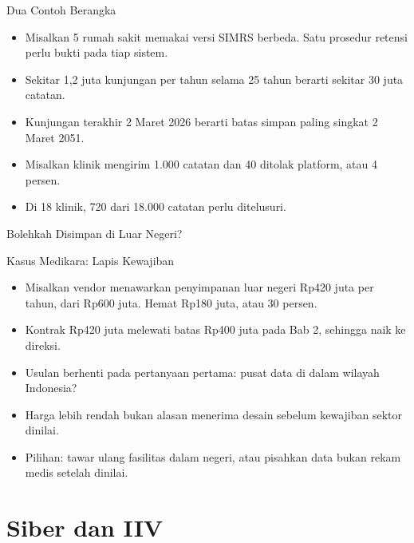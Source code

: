 \documentclass[aspectratio=169, table, 12pt]{beamer}
\begin{document}
\begin{frame}{{\Large Dua Contoh Berangka}}
  \vspace{4pt}
  \small
  \begin{itemize}
    \item Misalkan 5 rumah sakit memakai versi SIMRS berbeda. Satu prosedur retensi perlu bukti pada tiap
          sistem.
    \item Sekitar 1,2 juta kunjungan per tahun selama 25 tahun berarti sekitar 30 juta catatan.
    \item Kunjungan terakhir 2 Maret 2026 berarti batas simpan paling singkat 2 Maret 2051.
    \item Misalkan klinik mengirim 1.000 catatan dan 40 ditolak platform, atau 4 persen.
    \item Di 18 klinik, 720 dari 18.000 catatan perlu ditelusuri.
  \end{itemize}
\end{frame}

\begin{frame}{{\Large Bolehkah Disimpan di Luar Negeri?}}
  \centering
  \resizebox{!}{0.76\textheight}{}
\end{frame}

\begin{frame}{{\Large Kasus Medikara: Lapis Kewajiban}}
  \vspace{4pt}
  \small
  \begin{itemize}
    \item Misalkan vendor menawarkan penyimpanan luar negeri Rp420 juta per tahun, dari Rp600 juta. Hemat
          Rp180 juta, atau 30 persen.
    \item Kontrak Rp420 juta melewati batas Rp400 juta pada Bab 2, sehingga naik ke direksi.
    \item Usulan berhenti pada pertanyaan pertama: pusat data di dalam wilayah Indonesia?
    \item Harga lebih rendah bukan alasan menerima desain sebelum kewajiban sektor dinilai.
    \item Pilihan: tawar ulang fasilitas dalam negeri, atau pisahkan data bukan rekam medis setelah dinilai.
  \end{itemize}
\end{frame}

\section{Siber dan IIV}
\end{document}
